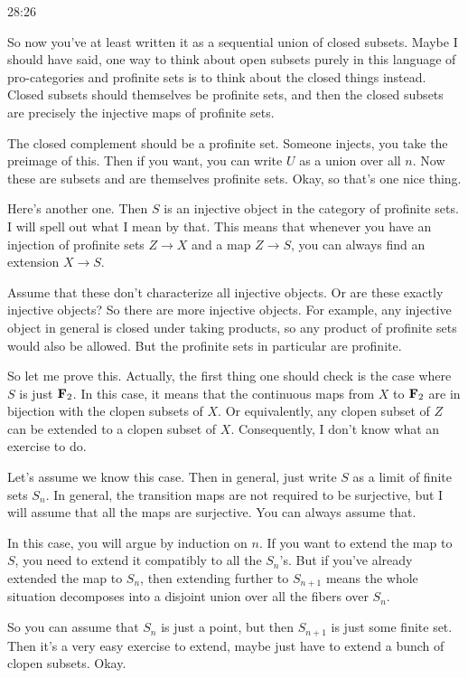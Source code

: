 \begin{example}
\begin{unfinished}{28:26}
\begin{remark}
So now you've at least written it as a sequential union of closed subsets. Maybe I should have said, one way to think about open subsets purely in this language of pro-categories and profinite sets is to think about the closed things instead. Closed subsets should themselves be profinite sets, and then the closed subsets are precisely the injective maps of profinite sets.

The closed complement should be a profinite set. Someone injects, you take the preimage of this. Then if you want, you can write $U$ as a union over all $n$. Now these are subsets and are themselves profinite sets. Okay, so that's one nice thing.

Here's another one. Then $S$ is an injective object in the category of profinite sets. I will spell out what I mean by that. This means that whenever you have an injection of profinite sets $Z \to X$ and a map $Z \to S$, you can always find an extension $X \to S$.

Assume that these don't characterize all injective objects. Or are these exactly injective objects? So there are more injective objects. For example, any injective object in general is closed under taking products, so any product of profinite sets would also be allowed. But the profinite sets in particular are profinite.

So let me prove this. 
Actually, the first thing one should check is the case where $S$ is just $\mathbf F_2$. In this case, it means that the continuous maps from $X$ to $\mathbf F_2$ are in bijection with the clopen subsets of $X$. Or equivalently, any clopen subset of $Z$ can be extended to a clopen subset of $X$. Consequently, I don't know what an exercise to do.

Let's assume we know this case. Then in general, just write $S$ as a limit of finite sets $S_n$. In general, the transition maps are not required to be surjective, but I will assume that all the maps are surjective. You can always assume that.

In this case, you will argue by induction on $n$. If you want to extend the map to $S$, you need to extend it compatibly to all the $S_n$'s. But if you've already extended the map to $S_n$, then extending further to $S_{n+1}$ means the whole situation decomposes into a disjoint union over all the fibers over $S_n$.

So you can assume that $S_n$ is just a point, but then $S_{n+1}$ is just some finite set. Then it's a very easy exercise to extend, maybe just have to extend a bunch of clopen subsets. Okay.


\end{remark}
\end{unfinished}
\end{example}
